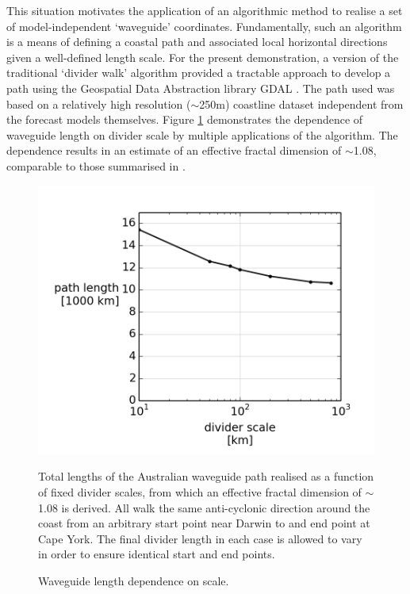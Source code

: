 This situation motivates the application of an algorithmic method to realise a set of model-independent `waveguide' coordinates.
Fundamentally, such an algorithm is a means of defining a coastal path and associated local horizontal directions given a well-defined length scale.
For the present demonstration, a version of the traditional `divider walk' \citep{Xu:1993} algorithm provided a tractable approach to develop a path using the Geospatial Data Abstraction library GDAL \citep{gdal}. 
The path used was based on a relatively high resolution ($\sim$250m) coastline dataset independent from the forecast models themselves.
Figure \ref{fig:mandelbrot_lengths} demonstrates the dependence of waveguide length on divider scale by multiple applications of the algorithm.  The dependence results in an estimate of an effective fractal dimension of $\sim$1.08, comparable to those summarised in \citep{MA2016}.
\begin{figure}[!hbt] \centering
    \includegraphics[width=\figwidthBig]{figures/plots/mandelbrot_lengths.png}
    \caption{Waveguide length dependence on scale.}{Total lengths of the Australian waveguide path realised as a function of fixed divider scales, from which an effective fractal dimension of $\sim$1.08 is derived.  
All walk the same anti-cyclonic direction around the coast from an arbitrary start point near Darwin to and end point at Cape York. 
The final divider length in each case is allowed to vary in order to ensure identical start and end points.}
    \label{fig:mandelbrot_lengths}
\end{figure}  
